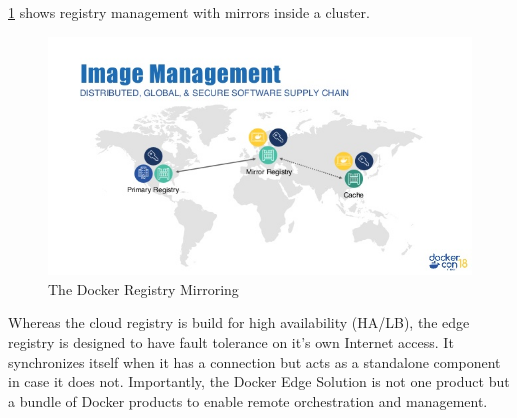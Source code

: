 \cref{fig:dockerRegistryForIoT} shows registry management with mirrors inside a cluster.
\begin{figure}[!ht]
    \centering
    \includegraphics[width=\textwidth]{figures/docker-edge-computing-with-docker-enterprise.jpg}
    \caption{The Docker Registry Mirroring}
    \label{fig:dockerRegistryForIoT}
\end{figure}

Whereas the cloud registry is build for high availability (HA/LB), the edge registry is designed to have fault tolerance on it's own Internet access. It synchronizes itself when it has a connection but acts as a standalone component in case it does not.
Importantly, the Docker Edge Solution is not one product but a bundle of Docker products to enable remote orchestration and management.

